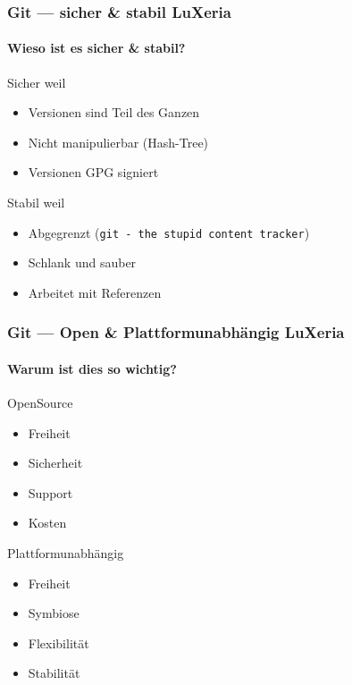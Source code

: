 \begin{frame}
    \frametitle{Git --- sicher \& stabil \hfill{} \footnotesize{LuXeria}}
    \framesubtitle{Wieso ist es sicher \& stabil?}
    \begin{block}{Sicher weil}
        \begin{itemize}
            \item Versionen sind Teil des Ganzen
            \item Nicht manipulierbar (Hash-Tree)
            \item Versionen GPG signiert
        \end{itemize}
    \end{block}
    \begin{block}{Stabil weil}
        \begin{itemize}
            \item Abgegrenzt (\lstinline$git - the stupid content tracker$)
            \item Schlank und sauber
            \item Arbeitet mit Referenzen
        \end{itemize}
    \end{block}
\end{frame}

\begin{frame}
    \frametitle{Git --- Open \& Plattformunabhängig \hfill{} \footnotesize{LuXeria}}
    \framesubtitle{Warum ist dies so wichtig?}
    \begin{block}{OpenSource}
        \begin{itemize}
            \item Freiheit
            \item Sicherheit
            \item Support
            \item Kosten
        \end{itemize}
    \end{block}
    \begin{block}{Plattformunabhängig}
        \begin{itemize}
            \item Freiheit
            \item Symbiose
            \item Flexibilität
            \item Stabilität
        \end{itemize}
    \end{block}
\end{frame}

